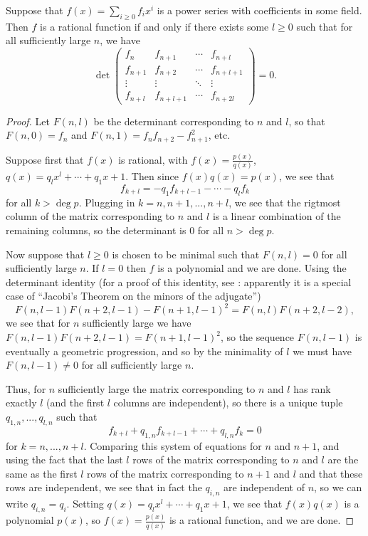 \documentclass[letterpaper,11pt]{article}
\begin{document}
\begin{lem} Suppose that $f(x) = \sum_{i \ge 0} f_ix^i$ is a power series with coefficients in some field. Then $f$ is a rational function if and only if there exists some $l \ge 0$ such that for all sufficiently large $n$, we have
\[
\det\begin{pmatrix}f_n & f_{n+1} & \cdots & f_{n+l} \\ f_{n+1} & f_{n+2} & \cdots & f_{n+l+1}\\ \vdots & \vdots & \ddots & \vdots \\ f_{n+l} & f_{n+l+1} & \cdots & f_{n+2l}\end{pmatrix} = 0.
\]
\end{lem}
\begin{proof} Let $F(n,l)$ be the determinant corresponding to $n$ and $l$, so that $F(n,0) = f_n$ and $F(n,1) = f_nf_{n+2} - f_{n+1}^2$, etc.

Suppose first that $f(x)$ is rational, with $f(x) = \frac{p(x)}{q(x)}$, $q(x) = q_lx^l + \cdots + q_1x + 1$. Then since $f(x)q(x) = p(x)$, we see that
\[
f_{k+l} = -q_1f_{k+l-1} - \cdots - q_lf_{k}
\]
for all $k > \deg p$. Plugging in $k = n, n+1, ..., n+l$, we see that the rigtmost column of the matrix corresponding to $n$ and $l$ is a linear combination of the remaining columns, so the determinant is $0$ for all $n > \deg p$.

Now suppose that $l \ge 0$ is chosen to be minimal such that $F(n,l) = 0$ for all sufficiently large $n$. If $l=0$ then $f$ is a polynomial and we are done. Using the determinant identity (for a proof of this identity, see \cite{local-fields}: apparently it is a special case of ``Jacobi's Theorem on the minors of the adjugate'')
\[
F(n,l-1)F(n+2,l-1) - F(n+1,l-1)^2 = F(n,l)F(n+2,l-2),
\]
we see that for $n$ sufficiently large we have $F(n,l-1)F(n+2,l-1) = F(n+1,l-1)^2$, so the sequence $F(n,l-1)$ is eventually a geometric progression, and so by the minimality of $l$ we must have $F(n,l-1) \ne 0$ for all sufficiently large $n$.

Thus, for $n$ sufficiently large the matrix corresponding to $n$ and $l$ has rank exactly $l$ (and the first $l$ columns are independent), so there is a unique tuple $q_{1,n}, ..., q_{l,n}$ such that
\[
f_{k+l} + q_{1,n}f_{k+l-1} + \cdots + q_{l,n}f_k = 0
\]
for $k = n, ..., n+l$. Comparing this system of equations for $n$ and $n+1$, and using the fact that the last $l$ rows of the matrix corresponding to $n$ and $l$ are the same as the first $l$ rows of the matrix corresponding to $n+1$ and $l$ and that these rows are independent, we see that in fact the $q_{i,n}$ are independent of $n$, so we can write $q_{i,n} = q_i$. Setting $q(x) = q_lx^l + \cdots + q_1x + 1$, we see that $f(x)q(x)$ is a polynomial $p(x)$, so $f(x) = \frac{p(x)}{q(x)}$ is a rational function, and we are done.
\end{proof}
\end{document}
